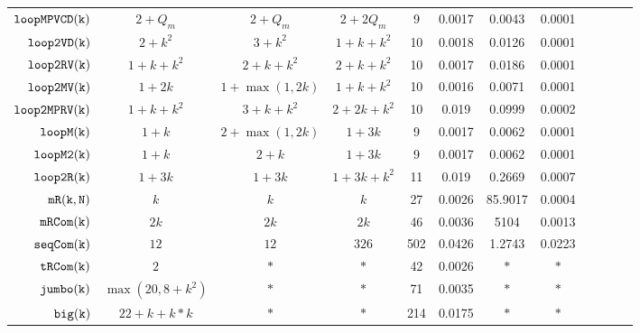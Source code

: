 {\begin {table}[H]
\begin{center}
{\begin{tabular}{| >{\tiny}r | c | c | c | c | c | c | c | c | c | c | c }
         $ {\mathtt{loopMPVCD(k)}}$ & $2+Q_m$ &  $2 + Q_m$  & $2+2Q_m$   &   9 & 0.0017 & 0.0043  & 0.0001 \\
         $  \mathtt{loop2VD(k)}$ & $2 + k^2$ &   $3 + k^2$ & $1 + k + k^2 $   &  10 & 0.0018 & 0.0126  & 0.0001  \\
         $  \mathtt{loop2RV(k)}$ & $1 + k +  k^2$ &  
         $ 2 + k +  k^2 $ 
         &  $2 + k + k^2$   &  10 & 0.0017 & 0.0186  & 0.0001  \\
         $  \mathtt{loop2MV(k)}$ & $1 + 2k $ & $1 + \max(1,2k) $ &  $1 + k + k^2 $  & 10 & 0.0016 & 0.0071  & 0.0001 \\
         $ \mathtt{loop2MPRV(k)}$ & $1 + k + k^2$ &  $3 + k + k^2  $ &  $2 + 2k + k^2  $  &  10 & 0.019 & 0.0999  & 0.0002 \\
         {$ \mathtt{loopM(k)}$} & $1 + k$ &  $ 2 + \max(1,2k) $ & $1 + 3k  $  &  9 & 0.0017 & 0.0062  & 0.0001  \\
         {$ \mathtt{loopM2(k)}$} & $1 + k$ &  $ 2 + k $ & $1 + 3k  $  &  9 & 0.0017 & 0.0062  & 0.0001  \\
         {$\mathtt{loop2R(k)}$} & $1 + 3k$ &  $1 + 3k $ &  $1 + 3k  + k^2$  &  11 & 0.019 & 0.2669  & 0.0007 \\
         $  \mathtt{mR(k, N)}$ & $k$ & $ k   $ & $k $   &  27 & 0.0026 & 85.9017  & 0.0004 \\
         $  \mathtt{mRCom(k)}$ & $2k$ & $  2k $ & $ 2k $   &  46 & 0.0036 & 5104  &  0.0013\\
         $  \mathtt{seqCom(k)}$ & $12$ & $12  $  & $326 $  &  502 & 0.0426  & 1.2743  & 0.0223 \\
         $  \mathtt{tRCom(k)}$ & $2$ &  $ * $ & $*  $  &  42 & 0.0026 & $*$  & $*$\\
         $  \mathtt{{jumbo(k)}}$ & $ \max(20, 8+k^2)$ &  $ * $   &   $* $  &  71 & 0.0035 & $*$ &  $*$ \\
         $  {\mathtt{big(k)}} $ & $22+k+k*k$ &  $* $ &  $* $  &  214 & 0.0175 & $*$ & $*$ \\
         \hline \hline
        \end{tabular}
}
\end{center}
\end{table}
}



